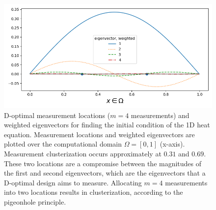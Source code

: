 \begin{figure}\label{fig:eigenvectors}
  \centering
  \includegraphics[width=\textwidth]{figs/eigenvectors_dst_scaled.png}
  \caption{D-optimal measurement locations ($m=4$ measurements) and
    weighted eigenvectors for finding the initial condition of the 1D
    heat equation. Measurement locations and weighted eigenvectors are
    plotted over the computational domain $\Omega = [0, 1]$
    (x-axis). Measurement clusterization occurs approximately at
    $0.31$ and $0.69$. These two locations are a compromise between
    the magnitudes of the first and second eigenvectors, which are the
    eigenvectors that a D-optimal design aims to measure. Allocating
    $m=4$ measurements into two locations results in clusterization,
    according to the pigeonhole principle.}
  \label{fig:why}
\end{figure}
 

